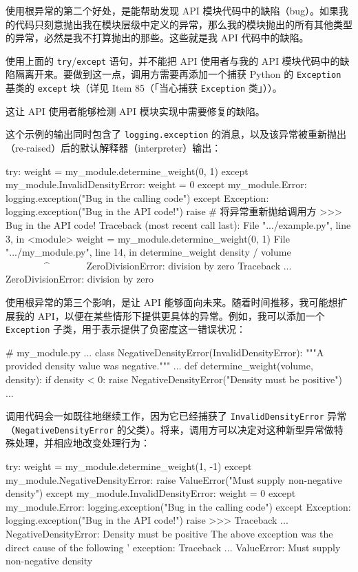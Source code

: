 使用根异常的第二个好处，是能帮助发现 API 模块代码中的缺陷（bug）。如果我的代码只刻意抛出我在模块层级中定义的异常，那么我的模块抛出的所有其他类型的异常，必然是我不打算抛出的那些。这些就是我 API 代码中的缺陷。

使用上面的 \texttt{try}/\texttt{except} 语句，并不能把 API 使用者与我的 API 模块代码中的缺陷隔离开来。要做到这一点，调用方需要再添加一个捕获 Python 的 \texttt{Exception} 基类的 \texttt{except} 块（详见 Item 85（「当心捕获 \texttt{Exception} 类」））。

这让 API 使用者能够检测 API 模块实现中需要修复的缺陷。

这个示例的输出同时包含了 \texttt{logging.exception} 的消息，以及该异常被重新抛出（re-raised）后的默认解释器（interpreter）输出：

\begin{codebox}[python]
try:
    weight = my_module.determine_weight(0, 1)
except my_module.InvalidDensityError:
    weight = 0
except my_module.Error:
    logging.exception("Bug in the calling code")
except Exception:
    logging.exception("Bug in the API code!")
    raise  # 将异常重新抛给调用方
>>>
Bug in the API code!
Traceback (most recent call last):
  File ".../example.py", line 3, in <module>
    weight = my_module.determine_weight(0, 1)
  File ".../my_module.py", line 14, in determine_weight
    density / volume
    ~~~~~~~~^~~~~~~~
ZeroDivisionError: division by zero
Traceback ...
ZeroDivisionError: division by zero
\end{codebox}

使用根异常的第三个影响，是让 API 能够面向未来。随着时间推移，我可能想扩展我的 API，以便在某些情形下提供更具体的异常。例如，我可以添加一个 \texttt{Exception} 子类，用于表示提供了负密度这一错误状况：

\begin{codebox}[python]
# my_module.py
...
class NegativeDensityError(InvalidDensityError):
    """A provided density value was negative."""
...
def determine_weight(volume, density):
    if density < 0:
        raise NegativeDensityError("Density must be positive")
    ...
\end{codebox}

调用代码会一如既往地继续工作，因为它已经捕获了 \texttt{InvalidDensityError} 异常（\texttt{NegativeDensityError} 的父类）。将来，调用方可以决定对这种新型异常做特殊处理，并相应地改变处理行为：

\begin{codebox}[python]
try:
    weight = my_module.determine_weight(1, -1)
except my_module.NegativeDensityError:
    raise ValueError("Must supply non-negative density")
except my_module.InvalidDensityError:
    weight = 0
except my_module.Error:
    logging.exception("Bug in the calling code")
except Exception:
    logging.exception("Bug in the API code!")
    raise
>>>
Traceback ...
NegativeDensityError: Density must be positive
The above exception was the direct cause of the following
' exception:
Traceback ...
ValueError: Must supply non-negative density
\end{codebox}

